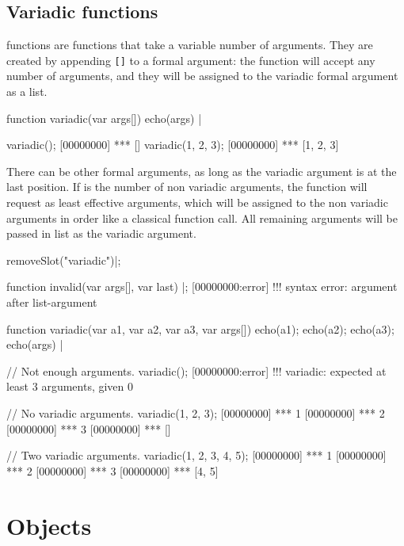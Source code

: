 \subsection{Variadic functions}
\label{sec:lang:fun-variadic}

 functions are functions that take a variable number of
arguments. They are created by appending \lstinline|[]| to a formal
argument: the function will accept any number of arguments, and they will be
assigned to the variadic formal argument as a list.

\begin{urbiscript}
function variadic(var args[])
{
  echo(args)
} |

variadic();
[00000000] *** []
variadic(1, 2, 3);
[00000000] *** [1, 2, 3]
\end{urbiscript}

There can be other formal arguments, as long as the variadic argument is at
the last position. If  is the number of non variadic arguments, the
function will request as least  effective arguments, which will be
assigned to the non variadic arguments in order like a classical function
call. All remaining arguments will be passed in list as the variadic
argument.

\begin{urbicomment}
removeSlot("variadic")|;
\end{urbicomment}

\begin{urbiscript}
function invalid(var args[], var last)
{} |;
[00000000:error] !!! syntax error: argument after list-argument

function variadic(var a1, var a2, var a3, var args[])
{
  echo(a1);
  echo(a2);
  echo(a3);
  echo(args)
} |

// Not enough arguments.
variadic();
[00000000:error] !!! variadic: expected at least 3 arguments, given 0

// No variadic arguments.
variadic(1, 2, 3);
[00000000] *** 1
[00000000] *** 2
[00000000] *** 3
[00000000] *** []

// Two variadic arguments.
variadic(1, 2, 3, 4, 5);
[00000000] *** 1
[00000000] *** 2
[00000000] *** 3
[00000000] *** [4, 5]
\end{urbiscript}



\section{Objects}

